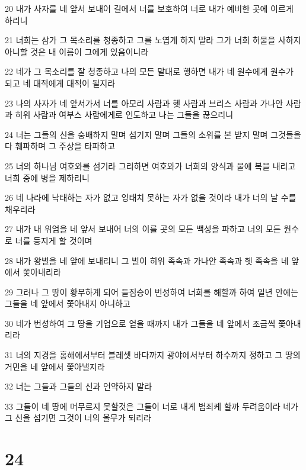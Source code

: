 \par 20 내가 사자를 네 앞서 보내어 길에서 너를 보호하여 너로 내가 예비한 곳에 이르게 하리니
\par 21 너희는 삼가 그 목소리를 청종하고 그를 노엽게 하지 말라 그가 너희 허물을 사하지 아니할 것은 내 이름이 그에게 있음이니라
\par 22 네가 그 목소리를 잘 청종하고 나의 모든 말대로 행하면 내가 네 원수에게 원수가 되고 네 대적에게 대적이 될지라
\par 23 나의 사자가 네 앞서가서 너를 아모리 사람과 헷 사람과 브리스 사람과 가나안 사람과 히위 사람과 여부스 사람에게로 인도하고 나는 그들을 끊으리니
\par 24 너는 그들의 신을 숭배하지 말며 섬기지 말며 그들의 소위를 본 받지 말며 그것들을 다 훼파하며 그 주상을 타파하고
\par 25 너의 하나님 여호와를 섬기라 그리하면 여호와가 너희의 양식과 물에 복을 내리고 너희 중에 병을 제하리니
\par 26 네 나라에 낙태하는 자가 없고 잉태치 못하는 자가 없을 것이라 내가 너의 날 수를 채우리라
\par 27 내가 내 위엄을 네 앞서 보내어 너의 이를 곳의 모든 백성을 파하고 너의 모든 원수로 너를 등지게 할 것이며
\par 28 내가 왕벌을 네 앞에 보내리니 그 벌이 히위 족속과 가나안 족속과 헷 족속을 네 앞에서 쫓아내리라
\par 29 그러나 그 땅이 황무하게 되어 들짐승이 번성하여 너희를 해할까 하여 일년 안에는 그들을 네 앞에서 쫓아내지 아니하고
\par 30 네가 번성하여 그 땅을 기업으로 얻을 때까지 내가 그들을 네 앞에서 조금씩 쫓아내리라
\par 31 너의 지경을 홍해에서부터 블레셋 바다까지 광야에서부터 하수까지 정하고 그 땅의 거민을 네 앞에서 쫓아낼지라
\par 32 너는 그들과 그들의 신과 언약하지 말라
\par 33 그들이 네 땅에 머무르지 못할것은 그들이 너로 내게 범죄케 할까 두려움이라 네가 그 신을 섬기면 그것이 너의 올무가 되리라

\chapter{24}

